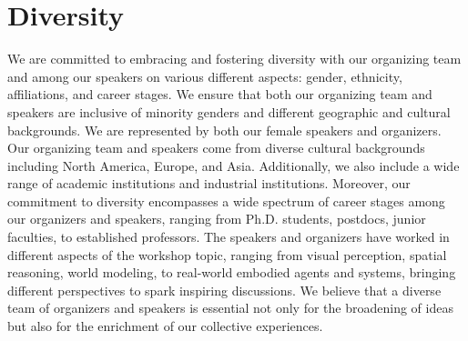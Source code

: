 \documentclass[runningheads]{llncs}
\begin{document}
\vspace{-1em}
\section{Diversity}
\vspace{-1.5em}

We are committed to embracing and fostering diversity with our organizing team and among our speakers on various different aspects: gender, ethnicity, affiliations, and career stages. We ensure that both our organizing team and speakers are inclusive of minority genders and different geographic and cultural backgrounds.
We are represented by both our female speakers and organizers. Our organizing team and speakers come from diverse cultural backgrounds including North America, Europe, and Asia. Additionally, we also include a wide range of academic institutions and industrial institutions.
Moreover, our commitment to diversity encompasses a wide spectrum of career stages among our organizers and speakers, ranging from Ph.D. students, postdocs, junior faculties, to established professors.
%
The speakers and organizers have worked in different aspects of the workshop topic, ranging from visual perception, spatial reasoning, world modeling, to real-world embodied agents and systems, bringing different perspectives to spark inspiring discussions. We believe that a diverse team of organizers and speakers is essential not only for the broadening of ideas but also for the enrichment of our collective experiences.

\clearpage

%
%


\end{document}
